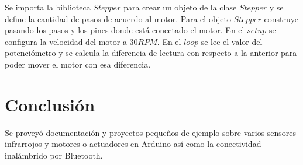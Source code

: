 \documentclass[conference]{IEEEtran}
\begin{document}
\bigbreak

Se importa la biblioteca $Stepper$ para crear un objeto de la clase $Stepper$ y se define la cantidad de pasos de acuerdo al motor. Para el objeto $Stepper$ construye pasando los pasos y los pines donde está conectado el motor. En el $setup$ se configura la velocidad del motor a $30RPM$. En el $loop$ se lee el valor del potenciómetro y se calcula la diferencia de lectura con respecto a la anterior para poder mover el motor con esa diferencia.

\section{Conclusión}

Se proveyó documentación y proyectos pequeños de ejemplo sobre varios sensores infrarrojos y motores o actuadores en Arduino así como la conectividad inalámbrido por Bluetooth.

\printbibliography
\end{document}
